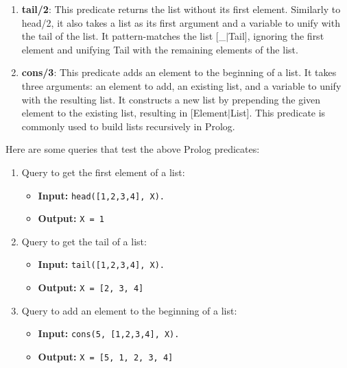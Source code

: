 \documentclass[12pt]{article}
\begin{document}
\begin{spacing}{1.5}
\begin{enumerate}
\begin{enumerate}
		      	\item \textbf{tail/2}: This predicate returns the list without its first element. Similarly to head/2, it also takes a list as its first argument and a variable to unify with the tail of the list. It pattern-matches the list [\_$|$Tail], ignoring the first element and unifying Tail with the remaining elements of the list.
		      	      		      	      		      	      
		      	\item \textbf{cons/3}: This predicate adds an element to the beginning of a list. It takes three arguments: an element to add, an existing list, and a variable to unify with the resulting list. It constructs a new list by prepending the given element to the existing list, resulting in [Element$|$List]. This predicate is commonly used to build lists recursively in Prolog.
		      \end{enumerate}
		      		      		      
		      Here are some queries that test the above Prolog predicates:
		      		      		      
		      \begin{enumerate}
		      	\item Query to get the first element of a list:
		      	      \begin{itemize}
		      	      	\item \textbf{Input:} \texttt{head([1,2,3,4], X).}
		      	      	\item \textbf{Output:} \texttt{X = 1} 
		      	      \end{itemize}
		      	      		      	      		      	      
		      	\item Query to get the tail of a list:
		      	      \begin{itemize}
		      	      	\item \textbf{Input:} \texttt{tail([1,2,3,4], X).}
		      	      	\item \textbf{Output:} \texttt{X = [2, 3, 4]} 
		      	      \end{itemize}
		      	      		      	      		      	      
		      	\item Query to add an element to the beginning of a list:
		      	      \begin{itemize}
		      	      	\item \textbf{Input:} \texttt{cons(5, [1,2,3,4], X).}
		      	      	\item \textbf{Output:} \texttt{X = [5, 1, 2, 3, 4]} 
		      	      \end{itemize}
		      \end{enumerate}
		      		      		      		      

\end{enumerate}
\end{spacing}
\end{document}
